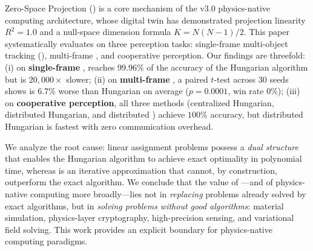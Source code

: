 Zero-Space Projection (\ZSP) is a core mechanism of the 
\abnqss v3.0 physics-native computing architecture, whose digital 
twin has demonstrated projection linearity $R^2 = 1.0$ and a 
null-space dimension formula $K = N(N-1)/2$. This paper 
systematically evaluates \ZSP on three perception tasks: 
single-frame multi-object tracking (\MOT), multi-frame \MOT, and 
cooperative perception. Our findings are threefold: 
(i) on \textbf{single-frame \MOT}, \ZSP reaches $99.96\%$ of the 
accuracy of the Hungarian algorithm but is $20{,}000\times$ slower; 
(ii) on \textbf{multi-frame \MOT}, a paired $t$-test across 30 seeds 
shows \ZSP is $6.7\%$ worse than Hungarian on average 
($p = 0.0001$, win rate $0\%$); 
(iii) on \textbf{cooperative perception}, all three methods 
(centralized Hungarian, distributed Hungarian, and distributed \ZSP) 
achieve $100\%$ accuracy, but distributed Hungarian is fastest with 
zero communication overhead. 

We analyze the root cause: linear assignment problems possess a 
\emph{dual structure} that enables the Hungarian algorithm to achieve 
exact optimality in polynomial time, whereas \ZSP is an iterative 
approximation that cannot, by construction, outperform the exact 
algorithm. We conclude that the value of \ZSP---and of physics-native 
computing more broadly---lies not in \emph{replacing} problems already 
solved by exact algorithms, but in \emph{solving problems without good 
algorithms}: material simulation, physics-layer cryptography, 
high-precision sensing, and variational field solving. This work 
provides an explicit boundary for physics-native computing paradigms.